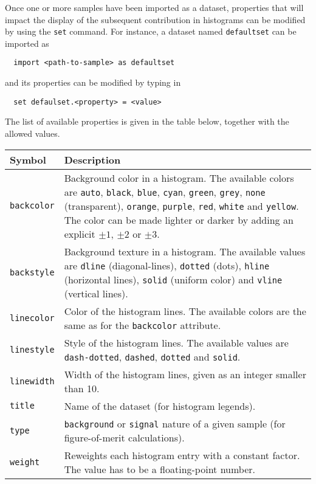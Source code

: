 \documentclass[a4paper]{article}
\begin{document}
\noindent Once one or more samples have been imported as a dataset, properties that will
impact the display of the subsequent contribution in histograms can be modified
by using the \verb+set+ command. For instance, a dataset named \verb?defaultset?
can be imported as
{\color{ao} \begin{verbatim}
  import <path-to-sample> as defaultset
\end{verbatim}}
\noindent and its properties can be modified by typing in
{\color{ao} \begin{verbatim}
  set defaulset.<property> = <value>
\end{verbatim}}
\noindent The list of available properties is given in the table below, together with the
allowed values.
\renewcommand{\arraystretch}{1.2}%
\begin{center}\begin{tabular}{l p{9.1cm}}
\hline
Symbol& Description\\
\hline
\color{ao} \verb?backcolor? & Background color in a histogram. The available colors are
   \verb?auto?, \verb?black?, \verb?blue?, \verb?cyan?, \verb?green?,
   \verb?grey?, \verb?none? (transparent), \verb?orange?, \verb?purple?,
   \verb?red?, \verb?white? and \verb?yellow?. The color can be made lighter or
    darker by adding an explicit $\pm 1$, $\pm 2$ or $\pm 3$.\\
\color{ao} \verb?backstyle? & Background texture in a histogram. The available values are
   \verb?dline? (diagonal-lines), \verb?dotted? (dots), \verb?hline? (horizontal
   lines), \verb?solid? (uniform color) and \verb?vline? (vertical lines).\\
\color{ao} \verb?linecolor? & Color of the histogram lines. The available colors are the
   same as for the \verb?backcolor? attribute.\\
\color{ao} \verb?linestyle? & Style of the histogram lines. The available values are
   \verb?dash-dotted?, \verb?dashed?, \verb?dotted? and \verb?solid?.\\
\color{ao} \verb?linewidth? & Width of the histogram lines, given as an integer smaller
   than 10.\\
\color{ao} \verb?title?     & Name of the dataset (for histogram legends).\\
\color{ao} \verb?type?      & \verb?background? or \verb?signal? nature of a given sample
  (for figure-of-merit calculations).\\
\color{ao} \verb?weight?    & Reweights each histogram entry with a constant factor. The
  value has to be a floating-point number.\\

\end{tabular}
\end{center}
\end{document}
